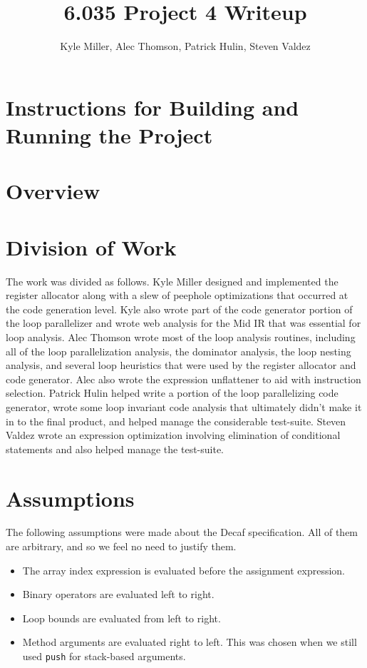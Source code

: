 \documentclass[11pt]{article}
\title{6.035 Project 4 Writeup}
\author{Kyle Miller, Alec Thomson, Patrick Hulin, Steven Valdez}
\begin{document}
\maketitle

\section {Instructions for Building and Running the Project}

\section {Overview}



\section {Division of Work}

The work was divided as follows. Kyle Miller designed and implemented
the register allocator along with a slew of peephole optimizations
that occurred at the code generation level. Kyle also wrote part of
the code generator portion of the loop parallelizer and wrote web
analysis for the Mid IR that was essential for loop analysis. Alec Thomson wrote most of
the loop analysis routines, including all of the loop parallelization
analysis, the dominator analysis, the loop nesting analysis, and
several loop heuristics that were used by the register allocator and
code generator. Alec
also wrote the expression unflattener to aid with instruction
selection. Patrick Hulin helped write a portion of the loop
parallelizing code generator, wrote some loop invariant code analysis
that ultimately didn't make it in to the final product, and helped
manage the considerable test-suite. Steven Valdez wrote an expression
optimization involving elimination of conditional statements and also
helped manage the test-suite. 

\section{Assumptions}

The following assumptions were made about the Decaf specification.
All of them are arbitrary, and so we feel no need to justify them.
\begin{itemize}
\item The array index expression is evaluated before the assignment
  expression.
\item Binary operators are evaluated left to right.
\item Loop bounds are evaluated from left to right.
\item Method arguments are evaluated right to left.  This was chosen
  when we still used \texttt{push} for stack-based arguments.
\end{itemize}
\end{document}
